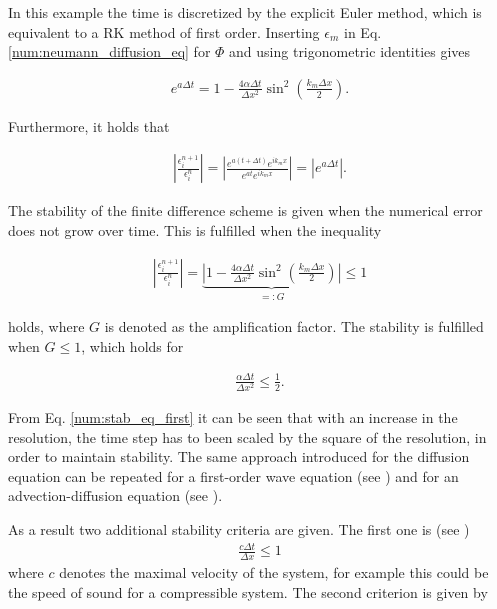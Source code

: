 In this example the time is discretized by the explicit Euler method, which is equivalent to a RK method of first order.
Inserting $\epsilon_m$ in Eq. \ref{num:neumann_diffusion_eq} for $\Phi$ and using trigonometric identities  gives

\begin{align}
    e^{a \Delta t} = 1 -  \frac{4\alpha \Delta t}{\Delta x^2} \sin^2\left(\frac{k_m \Delta x}{2}\right).
\end{align}

Furthermore, it holds that

\begin{align}
    \left|\frac{\epsilon_i^{n+1}}{\epsilon_i^n}\right| =
    \left|\frac{e^{a(t + \Delta t)}e^{ik_mx}}{ e^{at}e^{ik_m x}}\right| = \left|e^{a\Delta t}\right|.
\end{align}

The stability of the finite difference scheme is given when the numerical error does not grow over time. This is fulfilled when the inequality

\begin{align}
    \label{num:stab_ineq}
    \left|\frac{\epsilon_i^{n+1}}{\epsilon_i^n}\right| =
    \underbrace{\left|1 -  \frac{4\alpha \Delta t}{\Delta x^2} \sin^2\left(\frac{k_m \Delta x}{2}\right)\right|}_{=:G} \leq 1
\end{align}

holds, where $G$ is denoted as the amplification factor. The stability is fulfilled when $G\leq1$, which holds for

\begin{align}
    \label{num:stab_eq_first}
   \frac{\alpha \Delta t}{\Delta x^2} \leq \frac{1}{2}.
\end{align}

From Eq. \ref{num:stab_eq_first} it can be seen that with an increase in the resolution,
the time step has to been scaled by the square of the resolution, in order to
maintain stability. The same approach introduced for the diffusion equation can be repeated for a first-order wave equation (see \citep{janderson})
and for an advection-diffusion equation (see \citep{ferziger99}).

As a result two additional stability criteria are given.
The first one is (see \citep{janderson})
\begin{align}
    \label{num:stab_soundspeed}
   \frac{c \Delta t}{\Delta x} \leq 1
\end{align}
where $c$ denotes the maximal velocity of the system, for example this could be the speed of sound for a compressible system.
The second criterion is given by

